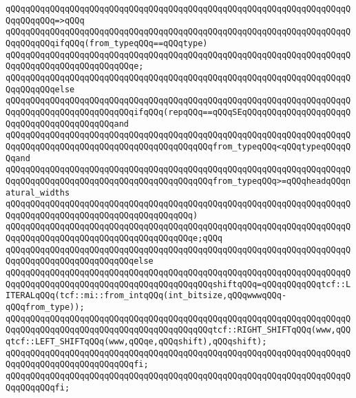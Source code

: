 \verb|qQQqqQQqqQQqqQQqqQQqqQQqqQQqqQQqqQQqqQQqqQQqqQQqqQQqqQQqqQQqqQQqqQQqqQQqqQQqqQQq=>qQQq|\newline
\verb|qQQqqQQqqQQqqQQqqQQqqQQqqQQqqQQqqQQqqQQqqQQqqQQqqQQqqQQqqQQqqQQqqQQqqQQqqQQqqQQqifqQQq(from_typeqQQq==qQQqtype)|\newline
\verb|qQQqqQQqqQQqqQQqqQQqqQQqqQQqqQQqqQQqqQQqqQQqqQQqqQQqqQQqqQQqqQQqqQQqqQQqqQQqqQQqqQQqqQQqqQQqqQQqe;|\newline
\verb|qQQqqQQqqQQqqQQqqQQqqQQqqQQqqQQqqQQqqQQqqQQqqQQqqQQqqQQqqQQqqQQqqQQqqQQqqQQqqQQqelse|\newline
\verb|qQQqqQQqqQQqqQQqqQQqqQQqqQQqqQQqqQQqqQQqqQQqqQQqqQQqqQQqqQQqqQQqqQQqqQQqqQQqqQQqqQQqqQQqqQQqqQQqifqQQq(repqQQq==qQQqSEqQQqqQQqqQQqqQQqqQQqqQQqqQQqqQQqqQQqqQQqqQQqand|\newline
\verb|qQQqqQQqqQQqqQQqqQQqqQQqqQQqqQQqqQQqqQQqqQQqqQQqqQQqqQQqqQQqqQQqqQQqqQQqqQQqqQQqqQQqqQQqqQQqqQQqqQQqqQQqqQQqqQQqfrom_typeqQQq<qQQqtypeqQQqqQQqand|\newline
\verb|qQQqqQQqqQQqqQQqqQQqqQQqqQQqqQQqqQQqqQQqqQQqqQQqqQQqqQQqqQQqqQQqqQQqqQQqqQQqqQQqqQQqqQQqqQQqqQQqqQQqqQQqqQQqqQQqfrom_typeqQQq>=qQQqheadqQQqnatural_widths|\newline
\verb|qQQqqQQqqQQqqQQqqQQqqQQqqQQqqQQqqQQqqQQqqQQqqQQqqQQqqQQqqQQqqQQqqQQqqQQqqQQqqQQqqQQqqQQqqQQqqQQqqQQqqQQqqQQq)|\newline
\verb|qQQqqQQqqQQqqQQqqQQqqQQqqQQqqQQqqQQqqQQqqQQqqQQqqQQqqQQqqQQqqQQqqQQqqQQqqQQqqQQqqQQqqQQqqQQqqQQqqQQqqQQqqQQqe;qQQq|\newline
\verb|qQQqqQQqqQQqqQQqqQQqqQQqqQQqqQQqqQQqqQQqqQQqqQQqqQQqqQQqqQQqqQQqqQQqqQQqqQQqqQQqqQQqqQQqqQQqqQQqelse|\newline
\verb|qQQqqQQqqQQqqQQqqQQqqQQqqQQqqQQqqQQqqQQqqQQqqQQqqQQqqQQqqQQqqQQqqQQqqQQqqQQqqQQqqQQqqQQqqQQqqQQqqQQqqQQqqQQqqQQqshiftqQQq=qQQqqQQqqQQqtcf::LITERALqQQq(tcf::mi::from_intqQQq(int_bitsize,qQQqwwwqQQq-qQQqfrom_type));|\newline
\newline
\verb|qQQqqQQqqQQqqQQqqQQqqQQqqQQqqQQqqQQqqQQqqQQqqQQqqQQqqQQqqQQqqQQqqQQqqQQqqQQqqQQqqQQqqQQqqQQqqQQqqQQqqQQqqQQqqQQqtcf::RIGHT_SHIFTqQQq(www,qQQqtcf::LEFT_SHIFTqQQq(www,qQQqe,qQQqshift),qQQqshift);|\newline
\verb|qQQqqQQqqQQqqQQqqQQqqQQqqQQqqQQqqQQqqQQqqQQqqQQqqQQqqQQqqQQqqQQqqQQqqQQqqQQqqQQqqQQqqQQqqQQqqQQqfi;|\newline
\verb|qQQqqQQqqQQqqQQqqQQqqQQqqQQqqQQqqQQqqQQqqQQqqQQqqQQqqQQqqQQqqQQqqQQqqQQqqQQqqQQqfi;|\newline
\newline
